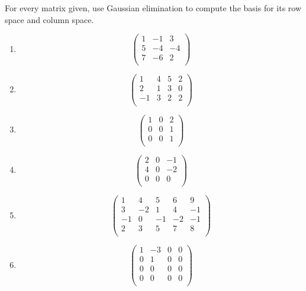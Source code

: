 \documentclass[12pt]{article} %
\title{}
\begin{document}
\maketitle
For every matrix given, use Gaussian elimination to compute the basis for its row space and column space.
\begin{enumerate}
\item \[\left(\begin{array}{rrr}
1&-1&3\\
5&-4&-4\\
7&-6&2\\
\end{array}\right)
\]

\item \[\left(\begin{array}{rrrr}
1&4&5&2\\
2&1&3&0\\
-1&3&2&2\\
\end{array}\right)
\]

\item \[\left(\begin{array}{rrr}
1&0&2\\
0&0&1\\
0&0&1\\
\end{array}\right)
\]

\item \[\left(\begin{array}{rrr}
2&0&-1\\
4&0&-2\\
0&0&0\\
\end{array}\right)
\]

\item \[\left(\begin{array}{rrrrr}
1&4&5&6&9\\
3&-2&1&4&-1\\
-1&0&-1&-2&-1\\
2&3&5&7&8\\
\end{array}\right)
\]

\item \[\left(\begin{array}{rrrr}
1&-3&0&0\\
0&1&0&0\\
0&0&0&0\\
0&0&0&0\\
\end{array}\right)
\]
\end{enumerate}
\end{document}
